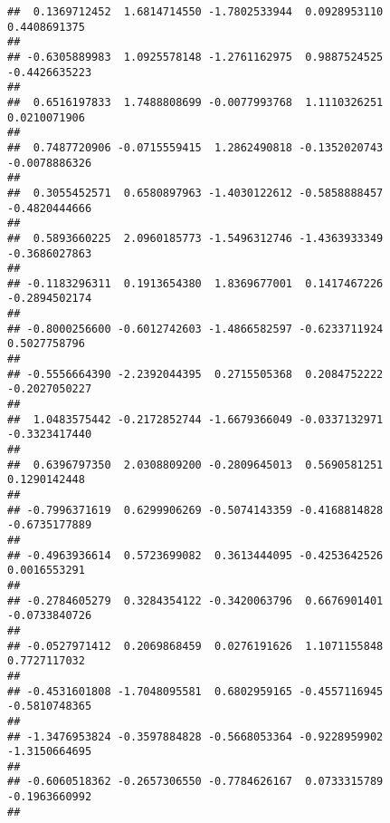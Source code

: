 \documentclass[]{article}
\begin{document}
\begin{verbatim}
##  0.1369712452  1.6814714550 -1.7802533944  0.0928953110  0.4408691375 
##                                                                       
## -0.6305889983  1.0925578148 -1.2761162975  0.9887524525 -0.4426635223 
##                                                                       
##  0.6516197833  1.7488808699 -0.0077993768  1.1110326251  0.0210071906 
##                                                                       
##  0.7487720906 -0.0715559415  1.2862490818 -0.1352020743 -0.0078886326 
##                                                                       
##  0.3055452571  0.6580897963 -1.4030122612 -0.5858888457 -0.4820444666 
##                                                                       
##  0.5893660225  2.0960185773 -1.5496312746 -1.4363933349 -0.3686027863 
##                                                                       
## -0.1183296311  0.1913654380  1.8369677001  0.1417467226 -0.2894502174 
##                                                                       
## -0.8000256600 -0.6012742603 -1.4866582597 -0.6233711924  0.5027758796 
##                                                                       
## -0.5556664390 -2.2392044395  0.2715505368  0.2084752222 -0.2027050227 
##                                                                       
##  1.0483575442 -0.2172852744 -1.6679366049 -0.0337132971 -0.3323417440 
##                                                                       
##  0.6396797350  2.0308809200 -0.2809645013  0.5690581251  0.1290142448 
##                                                                       
## -0.7996371619  0.6299906269 -0.5074143359 -0.4168814828 -0.6735177889 
##                                                                       
## -0.4963936614  0.5723699082  0.3613444095 -0.4253642526  0.0016553291 
##                                                                       
## -0.2784605279  0.3284354122 -0.3420063796  0.6676901401 -0.0733840726 
##                                                                       
## -0.0527971412  0.2069868459  0.0276191626  1.1071155848  0.7727117032 
##                                                                       
## -0.4531601808 -1.7048095581  0.6802959165 -0.4557116945 -0.5810748365 
##                                                                       
## -1.3476953824 -0.3597884828 -0.5668053364 -0.9228959902 -1.3150664695 
##                                                                       
## -0.6060518362 -0.2657306550 -0.7784626167  0.0733315789 -0.1963660992 
##                                                                       

\end{verbatim}
\end{document}
